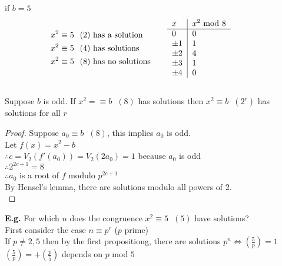 \documentclass[11pt]{article}
\begin{document}
if $b=5$
\begin{align*}
	\begin{split}
		x^2 &\equiv 5 \hspace{7pt} (2) \text{ has a solution}\\
		x^2 &\equiv 5 \hspace{7pt} (4) \text{ has solutions} \\
		x^2 &\equiv 5 \hspace{7pt} (8) \text{ has no solutions} 
	\end{split} &&&&&
	\begin{tabular}{l|l}	
		\multicolumn{1}{l|}{$x$} & \multicolumn{1}{l}{$x^2$ mod 8} \\ \hline
		0        & 0 \\
		$\pm1$   & 1 \\
		$\pm2$   & 4 \\
		$\pm3$   & 1 \\
		$\pm 4$  & 0
	\end{tabular} &&&&& \\[1em]
\end{align*}

\begin{proposition}
	Suppose $b$ is odd. If $x^{2} = \equiv b \hspace{7pt} (8)$ has solutions then $x^2 \equiv b\hspace{7pt} (2^r) $ has solutions for all $r$ 
\end{proposition}
\begin{proof}
	Suppose $a_0 \equiv b \hspace{7pt} (8) $, this implies $a_0$ is odd.\\
	Let $f(x) = x^2 -b$ \\[0.5em]
       	$\therefore c = V_2(f'(a_0)) = V_2(2a_0) = 1 $ because $a_0$ is odd\\[0.5em]
	$\therefore 2^{2c+1} = 8$\\[0.5em]
	$\therefore a_0$ is a root of $f$ modulo $p^{2c+1}$\\[0.5em]
	By Hensel's lemma, there are solutions modulo all powers of 2.\\[1em]
\end{proof}

\textbf{E.g.} For which $n$ does the congruence $x^2 \equiv 5 \hspace{7pt} (5) $ have solutions?\\[1em]
First consider the case $n \equiv p^r $\hspace{7pt} ($p$ prime)\\
If $p \neq 2, 5 $ then by the first propositiong, there are solutions $p^n \iff (\frac{5}{p}) = 1$\\[0.5em]
$(\frac{5}{p}) = + (\frac{p}{5})$ depends on $p $ mod $5$ 
\end{document}
